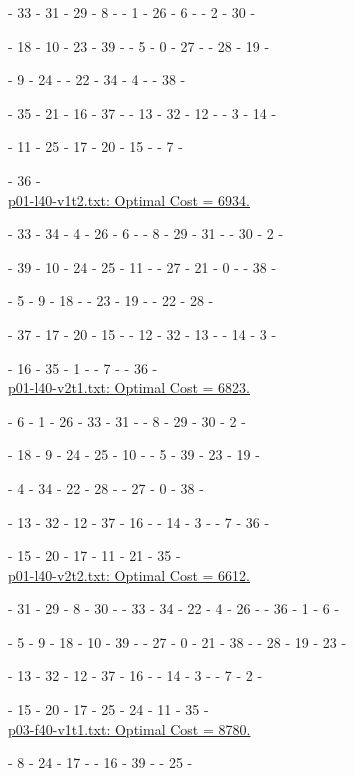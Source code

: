 \ta - 33 - 31 - 29 - 8 - \ta - 1 - 26 - 6 - \ta - 2 - 30 - \ta 

\tc - 18 - 10 - 23 - 39 -  \tc - 5 - 0 - 27 -  \tc - 28 - 19 -  \tc 

\tc - 9 - 24 - \tc - 22 - 34 - 4 - \tc - 38 - \tc 

\te - 35 - 21 - 16 - 37 - \te - 13 - 32 - 12 - \te - 3 - 14 - \te 

\te - 11 - 25 - 17 - 20 - 15 - \te - 7 - \te 

\te - 36 - \te 
\\ 

\underline{p01-l40-v1t2.txt: Optimal Cost =   6934.}

\ta - 33 - 34 - 4 - 26 - 6 - \ta - 8 - 29 - 31 - \ta - 30 - 2 - \ta 

\tc - 39 - 10 - 24 - 25 - 11 - \tc - 27 - 21 - 0 - \tc - 38 - \tc 

\tc - 5 - 9 - 18 - \tc - 23 - 19 - \tc - 22 - 28 - \tc                   

\te- 37 - 17 - 20 - 15 - \te - 12 - 32 - 13 - \te - 14 - 3 - \te 

\te- 16 - 35 - 1 - \te - 7 - \te - 36 - \te 
\\ 

\underline{p01-l40-v2t1.txt: Optimal Cost = 6823.}

\ta - 6 - 1 - 26 - 33 - 31 - \ta - 8 - 29 - 30 - 2 - \ta 

\tc- 18 - 9 - 24 - 25 - 10 - \tc - 5 - 39 - 23 - 19 - \tc 

\tc- 4 - 34 - 22 - 28 - \tc - 27 - 0 - 38 - \tc 

\te- 13 - 32 - 12 - 37 - 16 - \te - 14 - 3 - \te - 7 - 36 - \te 

\te- 15 - 20 - 17 - 11 - 21 - 35 - \te 
\\ 

\underline{p01-l40-v2t2.txt: Optimal Cost =  6612.} 

\ta- 31 - 29 - 8 - 30 - \ta - 33 - 34 - 22 - 4 - 26 - \ta - 36 - 1 - 6 - \ta 

\tc- 5 - 9 - 18 - 10 - 39 - \tc - 27 - 0 - 21 - 38 - \tc - 28 - 19 - 23 - \tc 

\te- 13 - 32 - 12 - 37 - 16 - \te - 14 - 3 - \te - 7 - 2 - \te 

\te- 15 - 20 - 17 - 25 - 24 - 11 - 35 - \te 
\\ 

\underline{p03-f40-v1t1.txt: Optimal Cost =  8780.}

\ta - 8 - 24 - 17 - \ta - 16 - 39 - \ta - 25 - \ta 

